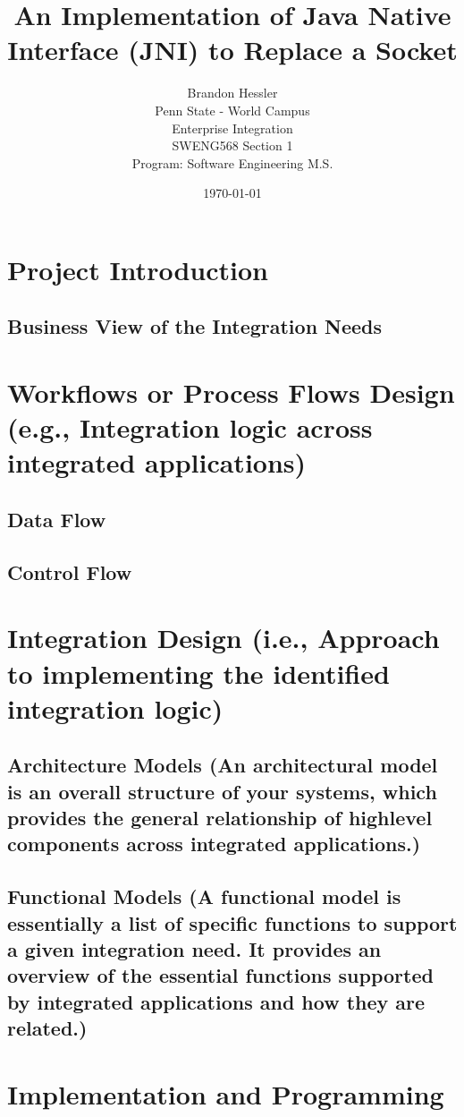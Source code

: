 \documentclass [a4paper,12pt,oneside,final,titlepage]{article}
\title{An Implementation of Java Native Interface (JNI) to Replace a Socket}
\author{Brandon Hessler  \\
	Penn State - World Campus  \\
	Enterprise Integration \\
	SWENG568 Section 1 \\
	Program: Software Engineering M.S. \\
	}
\date{\today}
\begin{document}
	\maketitle
	\tableofcontents
	
	\section{Project Introduction}
	
	\subsection{Business View of the Integration Needs }

	
	\section{Workflows or Process Flows Design (e.g., Integration logic across integrated applications)}
	
	\subsection{Data Flow}
	\subsection{Control Flow}
	

	\section{Integration Design (i.e., Approach to implementing the identified integration logic)}

	\subsection{Architecture Models (An architectural model is an overall structure of your systems, which provides the general relationship of highlevel components across integrated applications.) }

	\subsection{Functional Models (A functional model is essentially a list of specific functions to support a given integration need. It provides
an overview of the essential functions supported by integrated applications and how they are related.) }
	

	\section{Implementation and Programming}
	
\end{document}
